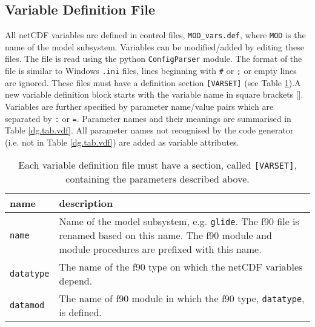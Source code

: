 \subsection{Variable Definition File}\label{dg.sec.vdf}
All netCDF variables are defined in control files, \texttt{MOD\_vars.def}, where \texttt{MOD} is the name of the model subsystem. Variables can be modified/added by editing these files. The file is read using the python \texttt{ConfigParser} module. The format of the file is similar to Windows \texttt{.ini} files, lines beginning with \texttt{\#} or \texttt{;} or empty lines are ignored. These files must have a definition section \texttt{[VARSET]} (see Table \ref{dg.tab.vdef}).A new variable definition block starts with the variable name in square brackets []. Variables are further specified by parameter name/value pairs which are separated by \texttt{:} or \texttt{=}. Parameter names and their meanings are summarised in Table \ref{dg.tab.vdf}. All parameter names not recognised by the code generator (i.e. not in Table \ref{dg.tab.vdf}) are added as variable attributes.

\begin{table}[htbp]
  \centering
  \begin{tabular}{|l|p{10cm}|}
    \hline
    name & description \\
    \hline
    \hline
    \texttt{name} & Name of the model subsystem, e.g. \texttt{glide}. The f90 file is renamed based on this name. The f90 module and module procedures are prefixed with this name.\\
    \hline
    \texttt{datatype} & The name of the f90 type on which the netCDF variables depend.\\
    \hline
    \texttt{datamod} & The name of f90 module in which the f90 type, \texttt{datatype}, is defined.\\
    \hline
  \end{tabular}
  \caption{Each variable definition file must have a section, called \texttt{[VARSET]}, containing the parameters described above.}
  \label{dg.tab.vdef}
\end{table}

